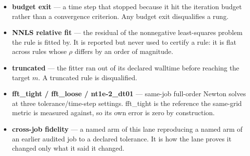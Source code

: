\documentclass[11pt]{article}
\begin{document}
\begin{itemize}
\item \textbf{budget exit} --- a time step that stopped because it hit the iteration budget rather than a convergence criterion. Any budget exit disqualifies a rung.
\item \textbf{NNLS relative fit} --- the residual of the nonnegative least-squares problem the rule is fitted by. It is reported but never used to certify a rule: it is flat across rules whose $\rho$ differs by an order of magnitude.
\item \textbf{truncated} --- the fitter ran out of its declared walltime before reaching the target $m$. A truncated rule is disqualified.
\item \textbf{fft\_tight / fft\_loose / nt1e-2\_dt01} --- same-job full-order Newton solves at three tolerance/time-step settings. fft\_tight is the reference the same-grid metric is measured against, so its own error is zero by construction.
\item \textbf{cross-job fidelity} --- a named arm of this lane reproducing a named arm of an earlier audited job to a declared tolerance. It is how the lane proves it changed only what it said it changed.
\end{itemize}
\end{document}
